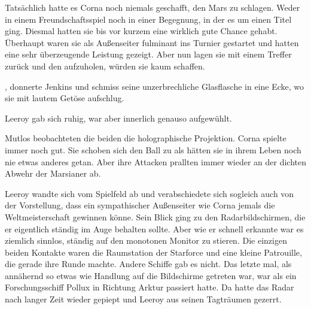 \par

Tatsächlich hatte es Corna noch niemals geschafft, den Mars zu schlagen. Weder in einem Freundschaftsspiel noch in einer Begegnung, in der es um einen Titel ging. Diesmal hatten sie bis vor kurzem eine wirklich gute Chance gehabt. Überhaupt waren sie als Außenseiter fulminant ins Turnier gestartet und hatten eine sehr überzeugende Leistung gezeigt. Aber nun lagen sie mit einem Treffer zurück und den aufzuholen, würden sie kaum schaffen.

\par

, donnerte Jenkins und schmiss seine unzerbrechliche Glasflasche in eine Ecke, wo sie mit lautem Getöse aufschlug. 

\par

Leeroy gab sich ruhig, war aber innerlich genauso aufgewühlt. 

\par

Mutlos beobachteten die beiden die holographische Projektion. Corna spielte immer noch gut. Sie schoben sich den Ball zu als hätten sie in ihrem Leben noch nie etwas anderes getan. Aber ihre Attacken prallten immer wieder an der dichten Abwehr der Marsianer ab.

\par

Leeroy wandte sich vom Spielfeld ab und verabschiedete sich sogleich auch von der Vorstellung, dass ein sympathischer Außenseiter wie Corna jemals die Weltmeisterschaft gewinnen könne. Sein Blick ging zu den Radarbildschirmen, die er eigentlich ständig im Auge behalten sollte. Aber wie er schnell erkannte war es ziemlich sinnlos, ständig auf den monotonen Monitor zu stieren. Die einzigen beiden Kontakte waren die Raumstation der Starforce und eine kleine Patrouille, die gerade ihre Runde machte. Andere Schiffe gab es nicht. Das letzte mal, als annähernd so etwas wie Handlung auf die Bildschirme getreten war, war als ein Forschungsschiff Pollux in Richtung Arktur passiert hatte. Da hatte das Radar nach langer Zeit wieder gepiept und Leeroy aus seinen Tagträumen gezerrt.

